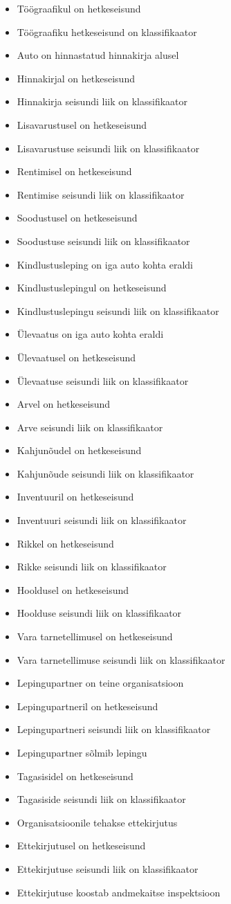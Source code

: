 \documentclass{report}
\begin{document}
\begin{itemize}
	\item Töögraafikul on hetkeseisund
	\item Töögraafiku hetkeseisund on klassifikaator
	\item Auto on hinnastatud hinnakirja alusel
	\item Hinnakirjal on hetkeseisund
	\item Hinnakirja seisundi liik on klassifikaator
	\item Lisavarustusel on hetkeseisund
	\item Lisavarustuse seisundi liik on klassifikaator
	\item Rentimisel on hetkeseisund
	\item Rentimise seisundi liik on klassifikaator
	\item Soodustusel on hetkeseisund
	\item Soodustuse seisundi liik on klassifikaator
	\item Kindlustusleping on iga auto kohta eraldi
	\item Kindlustuslepingul on hetkeseisund
	\item Kindlustuslepingu seisundi liik on klassifikaator
	\item Ülevaatus on iga auto kohta eraldi
	\item Ülevaatusel on hetkeseisund
	\item Ülevaatuse seisundi liik on klassifikaator
	\item Arvel on hetkeseisund
	\item Arve seisundi liik on klassifikaator
	\item Kahjunõudel on hetkeseisund
	\item Kahjunõude seisundi liik on klassifikaator
	\item Inventuuril on hetkeseisund
	\item Inventuuri seisundi liik on klassifikaator
	\item Rikkel on hetkeseisund
	\item Rikke seisundi liik on klassifikaator
	\item Hooldusel on hetkeseisund
	\item Hoolduse seisundi liik on klassifikaator
	\item Vara tarnetellimusel on hetkeseisund
	\item Vara tarnetellimuse seisundi liik on klassifikaator
	\item Lepingupartner on teine organisatsioon
	\item Lepingupartneril on hetkeseisund
	\item Lepingupartneri seisundi liik on klassifikaator
	\item Lepingupartner sõlmib lepingu
	\item Tagasisidel on hetkeseisund
	\item Tagasiside seisundi liik on klassifikaator
	\item Organisatsioonile tehakse ettekirjutus 
	\item Ettekirjutusel on hetkeseisund
	\item Ettekirjutuse seisundi liik on klassifikaator
	\item Ettekirjutuse koostab andmekaitse inspektsioon
\end{itemize}
 
\end{document}
